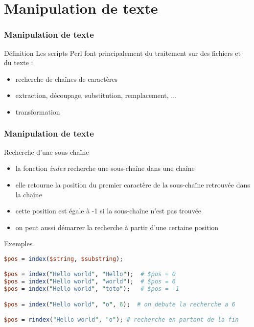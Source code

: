 \section{Manipulation de texte}

\begin{frame}[fragile]
  \frametitle{Manipulation de texte}

  \begin{block}{Définition}
    Les scripts Perl font principalement du traitement sur des fichiers
    et du texte :
    \begin{itemize}
    \item recherche de chaînes de caractères
    \item extraction, découpage, substitution, remplacement, ...
    \item transformation
    \end{itemize}
  \end{block}

\end{frame}

\begin{frame}[fragile]
  \frametitle{Manipulation de texte}

  \begin{block}{Recherche d'une sous-chaîne}
    \begin{itemize}
    \item la fonction \textit{index} recherche une sous-chaîne dans une
      chaîne
    \item elle retourne la position du premier caractère de la sous-chaîne
      retrouvée dans la chaîne
    \item cette position est égale à -1 si la sous-chaîne n'est pas trouvée
    \item on peut aussi démarrer la recherche à partir d'une certaine position
    \end{itemize}
  \end{block}

  \begin{exampleblock}{Exemples}
    \begin{lstlisting}[language=perl]
$pos = index($string, $substring);

$pos = index("Hello world", "Hello");  # $pos = 0
$pos = index("Hello world", "world");  # $pos = 6
$pos = index("Hello world", "toto");   # $pos = -1

$pos = index("Hello world", "o", 6);  # on debute la recherche a 6

$pos = rindex("Hello world", "o"); # recherche en partant de la fin
    \end{lstlisting}
  \end{exampleblock}
\end{frame}

